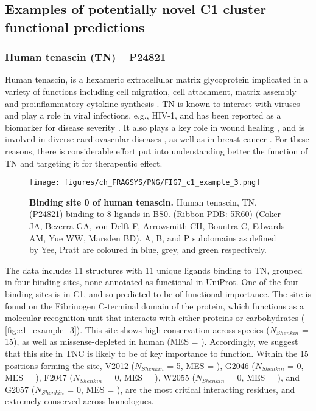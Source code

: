 \subsection{Examples of potentially novel C1 cluster functional predictions}

\subsubsection{Human tenascin (TN) -- P24821}

Human tenascin, is a hexameric extracellular matrix glycoprotein implicated in a variety of functions including cell migration, cell attachment, matrix assembly and proinflammatory cytokine synthesis \cite{BHATTACHARYYA_2022_TNC}. TN is known to interact with viruses and play a role in viral infections, e.g., HIV-1, and has been reported as a biomarker for disease severity \cite{ZULIANI_2023_TNC}. It also plays a key role in wound healing \cite{WANG_2022_TNC}, and is involved in diverse cardiovascular diseases \cite{KHOMTCHOUK_2022_TNC}, as well as in breast cancer \cite{LEPUCKI_2022_TNC}. For these reasons, there is considerable effort put into understanding better the function of TN and targeting it for therapeutic effect.

\begin{figure}[htb!]
    \centering
    \texttt{[image: figures/ch\_FRAGSYS/PNG/FIG7\_c1\_example\_3.png]}
    \caption[Binding site 0 of human tenascin]{\textbf{Binding site 0 of human tenascin.} Human tenascin, TN, (P24821) binding to 8 ligands in BS0. (Ribbon PDB: 5R60) (Coker JA, Bezerra GA, von Delft F, Arrowsmith CH, Bountra C, Edwards AM, Yue WW, Marsden BD). A, B, and P subdomains as defined by Yee, Pratt \cite{YEE_1997_FIBRINOGEN} are coloured in blue, grey, and green respectively.}
    \label{fig:c1_example_3}
\end{figure}

The data includes 11 structures with 11 unique ligands binding to TN, grouped in four binding sites, none annotated as functional in UniProt. One of the four binding sites is in C1, and so predicted to be of functional importance. The site is found on the Fibrinogen C-terminal domain of the protein, which functions as a molecular recognition unit that interacts with either proteins or carbohydrates ( \autoref{fig:c1_example_3}). This site shows high conservation across species ($N_{Shenkin}$ = 15), as well as missense-depleted in human (MES = ). Accordingly, we suggest that this site in TNC is likely to be of key importance to function. Within the 15 positions forming the site, V2012 ($N_{Shenkin}$ = 5, MES = ), G2046 ($N_{Shenkin}$ = 0, MES = ), F2047 ($N_{Shenkin}$ = 0, MES = ), W2055 ($N_{Shenkin}$ = 0, MES = ), and G2057 ($N_{Shenkin}$ = 0, MES = ), are the most critical interacting residues, and extremely conserved across homologues.

